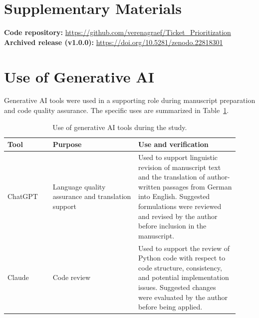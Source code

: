 \documentclass[manuscript, screen, review]{jair}
\begin{document}
\maketitle








\printbibliography

\appendix

\section{Supplementary Materials}

\noindent\textbf{Code repository:}
\url{https://github.com/verenagraef/Ticket_Prioritization}\\
\textbf{Archived release (v1.0.0):}
\url{https://doi.org/10.5281/zenodo.22818301}

\section{Use of Generative AI}

Generative AI tools were used in a supporting role during manuscript
preparation and code quality assurance. The specific uses are summarized in
Table~\ref{tab:ai-use}.

\begin{table}[ht]
\caption{Use of generative AI tools during the study.}
\label{tab:ai-use}
\begin{tabular}{p{0.18\linewidth} p{0.34\linewidth} p{0.40\linewidth}}
\toprule
Tool & Purpose & Use and verification \\
\midrule
ChatGPT
& Language quality assurance and translation support
& Used to support linguistic revision of manuscript text and the translation
of author-written passages from German into English. Suggested formulations
were reviewed and revised by the author before inclusion in the manuscript. \\

Claude
& Code review
& Used to support the review of Python code with respect to code structure,
consistency, and potential implementation issues. Suggested changes were
evaluated by the author before being applied. \\
\bottomrule
\end{tabular}
\end{table}
\end{document}

